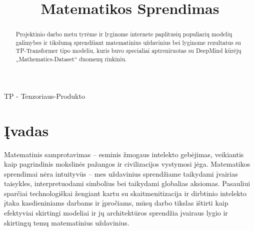 \documentclass[conference]{IEEEtran}
\begin{document}
\title{Matematikos Sprendimas}

\author{
\and
{}
\and
{}
}

\maketitle

\begin{abstract}
Projektinio darbo metu tyrėme ir lyginome internete paplitusių populiarių modelių
galimybes ir tikslumą sprendžiant matematinius uždavinius bei lyginome rezultatus su
TP-Transformer tipo modeliu, kuris buvo specialiai aptreniruotas su DeepMind kūrėjų
„Mathematics-Dataset“ duomenų rinkiniu.
\end{abstract}

\begin{IEEEkeywords}
TP - Tenzoriaus-Produkto
\end{IEEEkeywords}


\section{Įvadas}
Matematinis samprotavimas – esminis žmogaus intelekto gebėjimas, veikiantis kaip pagrindinis mokslinės pažangos ir civilizacijos vystymosi jėga. Matematikos sprendimai nėra intuityvūs – mes uždavinius sprendžiame taikydami įvairias taisykles, interpretuodami simbolius bei taikydami globalias aksiomas. Pasauliui sparčiai technologiškai žengiant kartu su skaitmenitizacija ir dirbtinio intelekto įtaka kasdieniniams darbams ir įpročiams, mūsų darbo tikslas ištirti kaip efektyviai skirtingi modeliai ir jų architektūros sprendžia įvairaus lygio ir skirtingų temų matematinius uždavinius.
\end{document}
